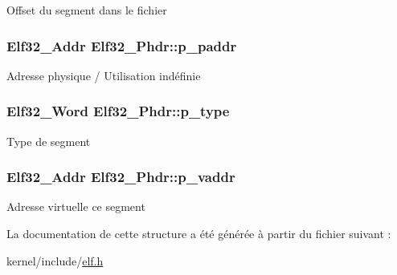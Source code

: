 Offset du segment dans le fichier \hypertarget{structElf32__Phdr_af18f0a179a5fca09e3c04bcdce3fac2f}{
\subsubsection[{p\+\_\+paddr}]{\setlength{\rightskip}{0pt plus 5cm}Elf32\+\_\+\+Addr Elf32\+\_\+\+Phdr\+::p\+\_\+paddr}}\label{structElf32__Phdr_af18f0a179a5fca09e3c04bcdce3fac2f}
Adresse physique / Utilisation indéfinie \hypertarget{structElf32__Phdr_a8b1d2942ddb9abcb85db1429b5116923}{
\subsubsection[{p\+\_\+type}]{\setlength{\rightskip}{0pt plus 5cm}Elf32\+\_\+\+Word Elf32\+\_\+\+Phdr\+::p\+\_\+type}}\label{structElf32__Phdr_a8b1d2942ddb9abcb85db1429b5116923}
Type de segment \hypertarget{structElf32__Phdr_a01a298ebc899bcf9c23211a7bf1155a6}{
\subsubsection[{p\+\_\+vaddr}]{\setlength{\rightskip}{0pt plus 5cm}Elf32\+\_\+\+Addr Elf32\+\_\+\+Phdr\+::p\+\_\+vaddr}}\label{structElf32__Phdr_a01a298ebc899bcf9c23211a7bf1155a6}
Adresse virtuelle ce segment 

La documentation de cette structure a été générée à partir du fichier suivant \+:\begin{DoxyCompactItemize}
\item 
kernel/include/\hyperlink{elf_8h}{elf.\+h}\end{DoxyCompactItemize}
